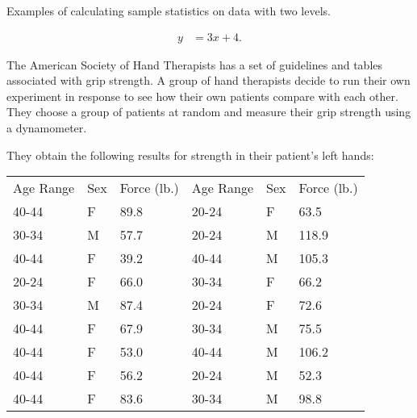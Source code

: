 


\begin{problem}
\item Examples of calculating sample statistics on data with two levels.

  \begin{subproblem}
  \item 
    \begin{eqnarray}
      y & = 3x + 4.
    \end{eqnarray}
    \vfill
  \end{subproblem}


\end{problem}




The American Society of Hand Therapists has a set of guidelines and
tables associated with grip strength. A group of hand therapists
decide to run their own experiment in response to see how their own
patients compare with each other. They choose a group of patients at
random and measure their grip strength using a dynamometer.

They obtain the following results for strength in their patient's
left hands: \\
\begin{tabular}{lll@{\hspace{4em}}lll}
Age Range & Sex & Force (lb.) & Age Range & Sex & Force (lb.) \\
40-44 & F & 89.8 & 20-24 & F & 63.5 \\
30-34 & M & 57.7 & 20-24 & M & 118.9 \\
40-44 & F & 39.2 & 40-44 & M & 105.3 \\
20-24 & F & 66.0 & 30-34 & F & 66.2 \\
30-34 & M & 87.4 & 20-24 & F & 72.6 \\
40-44 & F & 67.9 & 30-34 & M & 75.5 \\
40-44 & F & 53.0 & 40-44 & M & 106.2 \\
40-44 & F & 56.2 & 20-24 & M & 52.3 \\
40-44 & F & 83.6 & 30-34 & M & 98.8
\end{tabular}

